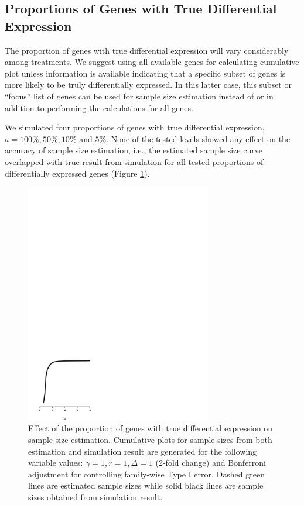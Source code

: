 \documentclass{bioinfo}
\begin{document}
\subsection{Proportions of Genes with True Differential Expression}

The proportion of genes with true differential expression will vary
considerably among treatments. We suggest using all available genes
for calculating cumulative plot unless information is available
indicating that a specific subset of genes is more likely to be
truly differentially expressed. In this latter case, this subset or
``focus'' list of genes can be used for sample size estimation
instead of or in addition to performing the calculations for all
genes.

We simulated four proportions of genes with true differential
expression, $a = 100\%, 50\%, 10\%$ and $5\%$. None of the tested
levels showed any effect on the accuracy of sample size
estimation, i.e., the estimated sample size curve overlapped with
true result from simulation for all tested proportions of
differentially expressed genes (Figure \ref{fig:ResAlt}).

\begin{figure}[h]
  \centerline{\includegraphics*[width=3.2in]{ResAlt.pdf}}
  \caption[Effect of the proportion of genes with true differential
  expression on sample size estimation] {Effect of the proportion of
  genes with true differential expression on sample size estimation.
  Cumulative plots for sample sizes from both estimation and
  simulation result are generated for the following variable values:
  $\gamma = 1, r = 1, \Delta = 1$ (2-fold change) and Bonferroni
  adjustment for controlling family-wise Type I error. Dashed green
  lines are estimated sample sizes while solid black lines are
  sample sizes obtained from simulation result.}
  \label{fig:ResAlt}
\end{figure}
\end{document}
